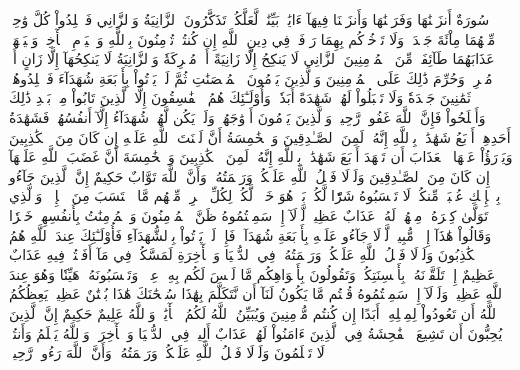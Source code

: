 سُورَةٌ أَنزَلۡنَٰهَا وَفَرَضۡنَٰهَا وَأَنزَلۡنَا فِيهَآ ءَايَٰتِۭ بَيِّنَٰتٖ لَّعَلَّكُمۡ تَذَكَّرُونَ
ٱلزَّانِيَةُ وَٱلزَّانِي فَٱجۡلِدُواْ كُلَّ وَٰحِدٖ مِّنۡهُمَا مِاْئَةَ جَلۡدَةٖۖ وَلَا تَأۡخُذۡكُم بِهِمَا رَأۡفَةٞ فِي دِينِ ٱللَّهِ إِن كُنتُمۡ تُؤۡمِنُونَ بِٱللَّهِ وَٱلۡيَوۡمِ ٱلۡأٓخِرِۖ وَلۡيَشۡهَدۡ عَذَابَهُمَا طَآئِفَةٞ مِّنَ ٱلۡمُؤۡمِنِينَ
ٱلزَّانِي لَا يَنكِحُ إِلَّا زَانِيَةً أَوۡ مُشۡرِكَةٗ وَٱلزَّانِيَةُ لَا يَنكِحُهَآ إِلَّا زَانٍ أَوۡ مُشۡرِكٞۚ وَحُرِّمَ ذَٰلِكَ عَلَى ٱلۡمُؤۡمِنِينَ
وَٱلَّذِينَ يَرۡمُونَ ٱلۡمُحۡصَنَٰتِ ثُمَّ لَمۡ يَأۡتُواْ بِأَرۡبَعَةِ شُهَدَآءَ فَٱجۡلِدُوهُمۡ ثَمَٰنِينَ جَلۡدَةٗ وَلَا تَقۡبَلُواْ لَهُمۡ شَهَٰدَةً أَبَدٗاۚ وَأُوْلَـٰٓئِكَ هُمُ ٱلۡفَٰسِقُونَ
إِلَّا ٱلَّذِينَ تَابُواْ مِنۢ بَعۡدِ ذَٰلِكَ وَأَصۡلَحُواْ فَإِنَّ ٱللَّهَ غَفُورٞ رَّحِيمٞ
وَٱلَّذِينَ يَرۡمُونَ أَزۡوَٰجَهُمۡ وَلَمۡ يَكُن لَّهُمۡ شُهَدَآءُ إِلَّآ أَنفُسُهُمۡ فَشَهَٰدَةُ أَحَدِهِمۡ أَرۡبَعُ شَهَٰدَٰتِۭ بِٱللَّهِ إِنَّهُۥ لَمِنَ ٱلصَّـٰدِقِينَ
وَٱلۡخَٰمِسَةُ أَنَّ لَعۡنَتَ ٱللَّهِ عَلَيۡهِ إِن كَانَ مِنَ ٱلۡكَٰذِبِينَ
وَيَدۡرَؤُاْ عَنۡهَا ٱلۡعَذَابَ أَن تَشۡهَدَ أَرۡبَعَ شَهَٰدَٰتِۭ بِٱللَّهِ إِنَّهُۥ لَمِنَ ٱلۡكَٰذِبِينَ
وَٱلۡخَٰمِسَةَ أَنَّ غَضَبَ ٱللَّهِ عَلَيۡهَآ إِن كَانَ مِنَ ٱلصَّـٰدِقِينَ
وَلَوۡلَا فَضۡلُ ٱللَّهِ عَلَيۡكُمۡ وَرَحۡمَتُهُۥ وَأَنَّ ٱللَّهَ تَوَّابٌ حَكِيمٌ
إِنَّ ٱلَّذِينَ جَآءُو بِٱلۡإِفۡكِ عُصۡبَةٞ مِّنكُمۡۚ لَا تَحۡسَبُوهُ شَرّٗا لَّكُمۖ بَلۡ هُوَ خَيۡرٞ لَّكُمۡۚ لِكُلِّ ٱمۡرِيٕٖ مِّنۡهُم مَّا ٱكۡتَسَبَ مِنَ ٱلۡإِثۡمِۚ وَٱلَّذِي تَوَلَّىٰ كِبۡرَهُۥ مِنۡهُمۡ لَهُۥ عَذَابٌ عَظِيمٞ
لَّوۡلَآ إِذۡ سَمِعۡتُمُوهُ ظَنَّ ٱلۡمُؤۡمِنُونَ وَٱلۡمُؤۡمِنَٰتُ بِأَنفُسِهِمۡ خَيۡرٗا وَقَالُواْ هَٰذَآ إِفۡكٞ مُّبِينٞ
لَّوۡلَا جَآءُو عَلَيۡهِ بِأَرۡبَعَةِ شُهَدَآءَۚ فَإِذۡ لَمۡ يَأۡتُواْ بِٱلشُّهَدَآءِ فَأُوْلَـٰٓئِكَ عِندَ ٱللَّهِ هُمُ ٱلۡكَٰذِبُونَ
وَلَوۡلَا فَضۡلُ ٱللَّهِ عَلَيۡكُمۡ وَرَحۡمَتُهُۥ فِي ٱلدُّنۡيَا وَٱلۡأٓخِرَةِ لَمَسَّكُمۡ فِي مَآ أَفَضۡتُمۡ فِيهِ عَذَابٌ عَظِيمٌ
إِذۡ تَلَقَّوۡنَهُۥ بِأَلۡسِنَتِكُمۡ وَتَقُولُونَ بِأَفۡوَاهِكُم مَّا لَيۡسَ لَكُم بِهِۦ عِلۡمٞ وَتَحۡسَبُونَهُۥ هَيِّنٗا وَهُوَ عِندَ ٱللَّهِ عَظِيمٞ
وَلَوۡلَآ إِذۡ سَمِعۡتُمُوهُ قُلۡتُم مَّا يَكُونُ لَنَآ أَن نَّتَكَلَّمَ بِهَٰذَا سُبۡحَٰنَكَ هَٰذَا بُهۡتَٰنٌ عَظِيمٞ
يَعِظُكُمُ ٱللَّهُ أَن تَعُودُواْ لِمِثۡلِهِۦٓ أَبَدًا إِن كُنتُم مُّؤۡمِنِينَ
وَيُبَيِّنُ ٱللَّهُ لَكُمُ ٱلۡأٓيَٰتِۚ وَٱللَّهُ عَلِيمٌ حَكِيمٌ
إِنَّ ٱلَّذِينَ يُحِبُّونَ أَن تَشِيعَ ٱلۡفَٰحِشَةُ فِي ٱلَّذِينَ ءَامَنُواْ لَهُمۡ عَذَابٌ أَلِيمٞ فِي ٱلدُّنۡيَا وَٱلۡأٓخِرَةِۚ وَٱللَّهُ يَعۡلَمُ وَأَنتُمۡ لَا تَعۡلَمُونَ
وَلَوۡلَا فَضۡلُ ٱللَّهِ عَلَيۡكُمۡ وَرَحۡمَتُهُۥ وَأَنَّ ٱللَّهَ رَءُوفٞ رَّحِيمٞ
